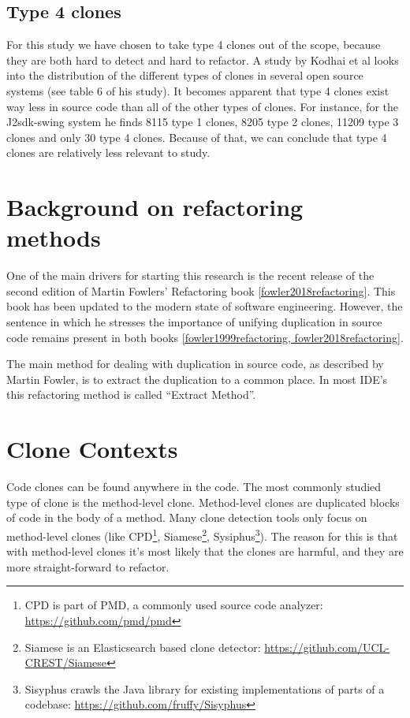 \subsection{Type 4 clones}
For this study we have chosen to take type 4 clones out of the scope, because they are both hard to detect and hard to refactor. A study by Kodhai et al \cite{kodhai2013method} looks into the distribution of the different types of clones in several open source systems (see table 6 of his study). It becomes apparent that type 4 clones exist way less in source code than all of the other types of clones. For instance, for the J2sdk-swing system he finds 8115 type 1 clones, 8205 type 2 clones, 11209 type 3 clones and only 30 type 4 clones. Because of that, we can conclude that type 4 clones are relatively less relevant to study.

\section{Background on refactoring methods}
One of the main drivers for starting this research is the recent release of the second edition of Martin Fowlers' Refactoring book \ref{fowler2018refactoring}. This book has been updated to the modern state of software engineering. However, the sentence in which he stresses the importance of unifying duplication in source code remains present in both books \ref{fowler1999refactoring, fowler2018refactoring}.

The main method for dealing with duplication in source code, as described by Martin Fowler, is to extract the duplication to a common place. In most IDE's this refactoring method is called ``Extract Method''.

\section{Clone Contexts} %
Code clones can be found anywhere in the code. The most commonly studied type of clone is the method-level clone. Method-level clones are duplicated blocks of code in the body of a method. Many clone detection tools only focus on method-level clones (like CPD\footnote{CPD is part of PMD, a commonly used source code analyzer: \url{https://github.com/pmd/pmd}}, Siamese\footnote{Siamese is an Elasticsearch based clone detector: \url{https://github.com/UCL-CREST/Siamese}}, Sysiphus\footnote{Sisyphus crawls the Java library for existing implementations of parts of a codebase: \url{https://github.com/fruffy/Sisyphus}}). The reason for this is that with method-level clones it's most likely that the clones are harmful, and they are more straight-forward to refactor.

